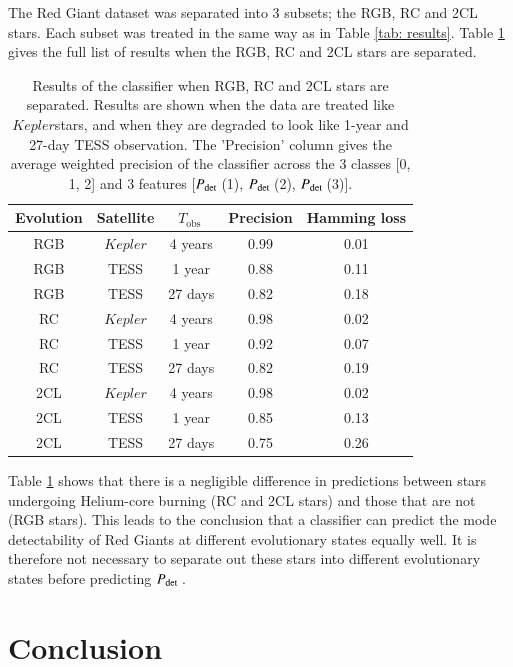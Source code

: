 \documentclass[a4paper,fleqn,usenatbib,useAMS]{mnras}
\newcommand{\kep}{\ensuremath{Kepler}\:}
\newcommand{\pdet}{\ensuremath{P_{\rm det}\:}}
\newcommand{\tobs}{\ensuremath{T_{\textrm{obs}}\:}}
\begin{document}
The Red Giant dataset was separated into 3 subsets; the RGB, RC and 2CL stars. Each subset was treated in the same way as in Table \ref{tab: results}. Table \ref{tab: evo results} gives the full list of results when the RGB, RC and 2CL stars are separated. 
\begin{table}
\begin{center}
\begin{tabular}{ |c|c|c|c|c| }
Evolution & Satellite & \tobs   & Precision & Hamming loss \\
\hline
RGB       & \kep      & 4 years & 0.99      & 0.01         \\
RGB       & TESS      & 1 year  & 0.88      & 0.11         \\
RGB       & TESS      & 27 days & 0.82      & 0.18         \\
\hline
RC        & \kep      & 4 years & 0.98      & 0.02         \\
RC        & TESS      & 1 year  & 0.92      & 0.07         \\
RC        & TESS      & 27 days & 0.82      & 0.19         \\
\hline
2CL       & \kep      & 4 years & 0.98      & 0.02         \\
2CL       & TESS      & 1 year  & 0.85      & 0.13         \\
2CL       & TESS      & 27 days & 0.75      & 0.26         \\
\end{tabular}
\end{center}
\caption{Results of the classifier when RGB, RC and 2CL stars are separated. Results are shown when the data are treated like \kep stars, and when they are degraded to look like 1-year and 27-day TESS observation. The 'Precision' column gives the average weighted precision of the classifier across the 3 classes [0, 1, 2] and 3 features [\pdet(1), \pdet(2), \pdet(3)].}
\label{tab: evo results}
\end{table}

Table \ref{tab: evo results} shows that there is a negligible difference in predictions between stars undergoing Helium-core burning (RC and 2CL stars) and those that are not (RGB stars). This leads to the conclusion that a classifier can predict the mode detectability of Red Giants at different evolutionary states equally well. It is therefore not necessary to separate out these stars into different evolutionary states before predicting \pdet.


\section{Conclusion}
\label{sect: conc}
\end{document}

